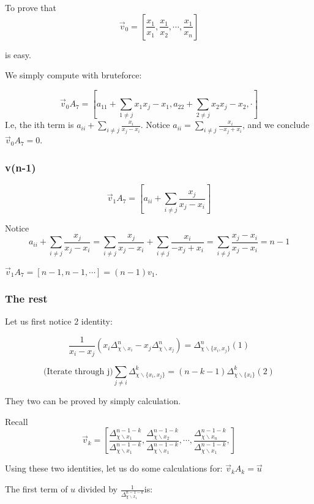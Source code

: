 \documentclass[12pt, a4paper]{article}
\theoremstyle{definition}
\theoremstyle{remark}
\begin{document}
To prove that
$$
	\vec{v}_0 =\left[\dfrac{x_1}{x_1}, \dfrac{x_1}{x_2}, \cdots ,\dfrac{x_1}{x_n}\right]
$$

is easy.

We simply compute with bruteforce:

$$
	\vec{v}_0 A_7 = [a_{11} + \sum_{1\neq j}{x_1}{x_j-x_1}, a_{22} + \sum_{2\neq j}{x_2}{x_j-x_2}, \cdot]
$$
I.e, the ith term is $a_{ii} +  \sum_{i\neq j}\frac{x_i}{x_j-x_i}$.
Notice $a_{ii} = \sum_{i\neq j} \frac{x_i}{-x_j+x_i}$, and we conclude $\vec{v}_0 A_7 = 0$.

\subsubsection{ v(n-1)}

$$
	\vec{v}_1 A_7 = [a_{ii} + \sum_{i\neq j}\frac{x_j}{x_j-x_i}]
$$

Notice
$$
	a_{ii} + \sum_{i\neq j}\frac{x_j}{x_j-x_i} = \sum_{i\neq j}\frac{x_j}{x_j-x_i} + \sum_{i\neq j}\frac{x_i}{-x_j+x_i} = \sum_{i\neq j}\frac{x_j-x_i}{x_j-x_i} = n-1
$$

$\vec{v}_1 A_7 = [n-1, n-1, \cdots] = (n-1) v_1$.

\subsubsection{ The rest}

Let us first notice 2 identity:

$$
	\frac{1}{x_i - x_j}(x_i \Delta^{n}_{\chi \smallsetminus x_i} - x_j \Delta^{n}_{\chi \smallsetminus x_j}) = \Delta^{n}_{\chi \smallsetminus \{x_i, x_j\}}  (1)
$$

$$
	\text{(Iterate through j)}\sum_{j \neq i} \Delta^{k}_{\chi \smallsetminus \{x_i, x_j\}} = (n-k-1) \Delta^{k}_{\chi \smallsetminus \{x_i\}} (2)
$$

They two can be proved by simply calculation.

Recall
$$
	\vec{v}_k =
	\left[
		\dfrac{\Delta^{n-1-k}_{\chi \smallsetminus x_1}}{\Delta^{n-1-k}_{\chi \smallsetminus x_1}},
		\dfrac{\Delta^{n-1-k}_{\chi \smallsetminus x_2}}{\Delta^{n-1-k}_{\chi \smallsetminus x_1}},
		\cdots ,
		\dfrac{\Delta^{n-1-k}_{\chi \smallsetminus x_n}}{\Delta^{n-1-k}_{\chi \smallsetminus x_1}},
		\right]
$$

Using these two identities, let us do some calculations for: $\vec{v}_k A_k = \vec{u}$

The first term of $u$ divided by $\frac{1}{\Delta^{n-1-k}_{\chi \smallsetminus x_1}}$is:
\end{document}
